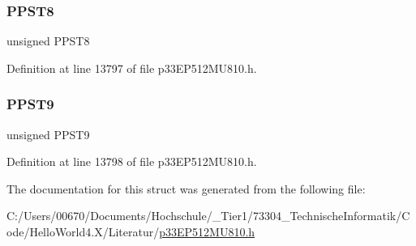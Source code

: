 \subsubsection{\texorpdfstring{P\+P\+S\+T8}{PPST8}}
{\footnotesize\ttfamily unsigned P\+P\+S\+T8}



Definition at line 13797 of file p33\+E\+P512\+M\+U810.\+h.

\mbox{\label{structtag_d_m_a_p_p_s_b_i_t_s_a12a16006e5a16be920f34fe125c8ad94}} 
\subsubsection{\texorpdfstring{P\+P\+S\+T9}{PPST9}}
{\footnotesize\ttfamily unsigned P\+P\+S\+T9}



Definition at line 13798 of file p33\+E\+P512\+M\+U810.\+h.



The documentation for this struct was generated from the following file\+:\begin{DoxyCompactItemize}
\item 
C\+:/\+Users/00670/\+Documents/\+Hochschule/\+\_\+\+Tier1/73304\+\_\+\+Technische\+Informatik/\+Code/\+Hello\+World4.\+X/\+Literatur/\hyperlink{p33_e_p512_m_u810_8h}{p33\+E\+P512\+M\+U810.\+h}\end{DoxyCompactItemize}
